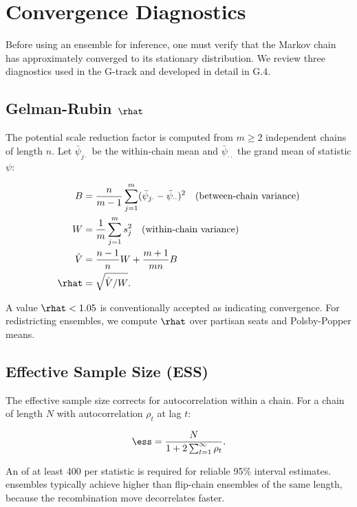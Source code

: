 \section{Convergence Diagnostics}
\label{sec:convergence}

Before using an ensemble for inference, one must verify that the Markov chain
has approximately converged to its stationary distribution.  We review three
diagnostics used in the G-track and developed in detail in G.4.

\subsection{Gelman-Rubin \texorpdfstring{$\rhat$}{R-hat}}

The \citet{gelman1992inference} potential scale reduction factor is computed
from $m \geq 2$ independent chains of length $n$.  Let $\bar{\psi}_{j\cdot}$
be the within-chain mean and $\bar{\psi}_{\cdot\cdot}$ the grand mean of
statistic $\psi$:

\begin{align}
  B &= \frac{n}{m-1} \sum_{j=1}^{m}(\bar{\psi}_{j\cdot} - \bar{\psi}_{\cdot\cdot})^2
      \quad \text{(between-chain variance)} \\
  W &= \frac{1}{m}\sum_{j=1}^{m} s_j^2
      \quad \text{(within-chain variance)} \\
  \hat{V} &= \frac{n-1}{n} W + \frac{m+1}{mn} B \\
  \rhat &= \sqrt{\hat{V}/W}.
\end{align}

A value $\rhat < 1.05$ is conventionally accepted as indicating convergence.
For redistricting ensembles, we compute $\rhat$ over partisan seats and
Polsby-Popper means.

\subsection{Effective Sample Size (ESS)}

The effective sample size corrects for autocorrelation within a chain.  For
a chain of length $N$ with autocorrelation $\rho_t$ at lag $t$:

\begin{equation}
  \ess = \frac{N}{1 + 2\sum_{t=1}^{\infty} \rho_t}.
  \label{eq:ess}
\end{equation}

An \ess{} of at least 400 per statistic is required for reliable 95\%
interval estimates.  \recom{} ensembles typically achieve higher \ess{} than
flip-chain ensembles of the same length, because the recombination move
decorrelates faster.

